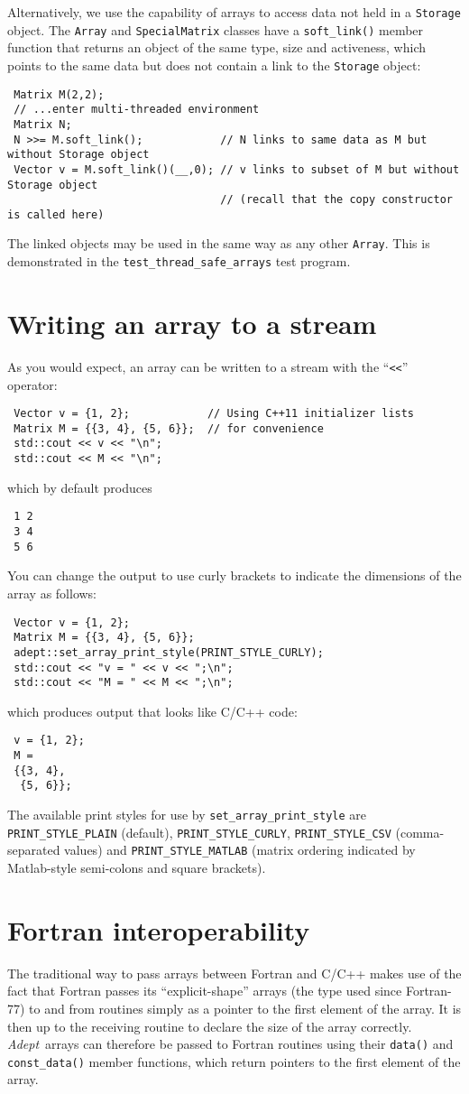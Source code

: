 \documentclass[a4,oneside]{book}
\def\codesize{\small}
\def\Adept{\emph{Adept}}
\def\code#1{{\codesize\texttt{#1}}}
\begin{document}
Alternatively, we use the capability of arrays to access data not held
in a \code{Storage} object. The \code{Array} and \code{SpecialMatrix}
classes have a \code{soft\_link()} member function that returns an
object of the same type, size and activeness, which points to the same
data but does not contain a link to the \code{Storage} object:
\begin{lstlisting}
 Matrix M(2,2);
 // ...enter multi-threaded environment
 Matrix N;
 N >>= M.soft_link();            // N links to same data as M but without Storage object
 Vector v = M.soft_link()(__,0); // v links to subset of M but without Storage object
                                 // (recall that the copy constructor is called here) 
\end{lstlisting}
The linked objects may be used in the same way as any other
\code{Array}. This is demonstrated in the
\code{test\_thread\_safe\_arrays} test program.
\section{Writing an array to a stream}
As you would expect, an array can be written to a stream with the
``\code{<<}'' operator:
\begin{lstlisting}
 Vector v = {1, 2};            // Using C++11 initializer lists
 Matrix M = {{3, 4}, {5, 6}};  // for convenience
 std::cout << v << "\n";
 std::cout << M << "\n";
\end{lstlisting}
which by default produces
\begin{lstlisting}
 1 2
 3 4
 5 6
\end{lstlisting}
You can change the output to use curly brackets to indicate
the dimensions of the array as follows:
\begin{lstlisting}
 Vector v = {1, 2};
 Matrix M = {{3, 4}, {5, 6}};
 adept::set_array_print_style(PRINT_STYLE_CURLY);
 std::cout << "v = " << v << ";\n";
 std::cout << "M = " << M << ";\n";
\end{lstlisting}
which produces output that looks like C/C++ code:
\begin{lstlisting}
 v = {1, 2};
 M =
 {{3, 4},
  {5, 6}};
\end{lstlisting}
The available print styles for use by \code{set\_array\_print\_style}
are \code{PRINT\_STYLE\_PLAIN} (default), \code{PRINT\_STYLE\_CURLY},
\code{PRINT\_STYLE\_CSV} (comma-separated values) and
\code{PRINT\_STYLE\_MATLAB} (matrix ordering indicated by Matlab-style
semi-colons and square brackets).

\section{Fortran interoperability}
\label{sec:fortran}
The traditional way to pass arrays between Fortran and C/C++ makes use
of the fact that Fortran passes its ``explicit-shape'' arrays (the
type used since Fortran-77) to and from routines simply as a pointer
to the first element of the array. It is then up to the receiving
routine to declare the size of the array correctly.  \Adept\ arrays
can therefore be passed to Fortran routines using their \code{data()}
and \code{const\_data()} member functions, which return pointers to
the first element of the array.
\end{document}
